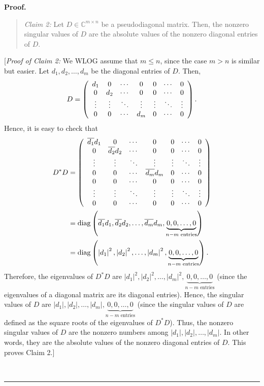 \documentclass[numbers=enddot,12pt,final,onecolumn,notitlepage]{scrartcl}%
\numberwithin{exer}{subsection}
\theoremstyle{definition}
\newenvironment{statement}{\begin{quote}}{\end{quote}}
\newenvironment{proof}[1][Proof]{\noindent\textbf{#1.} }{\ \rule{0.5em}{0.5em}}
\begin{document}
\begin{proof}
\begin{statement}
\textit{Claim 2:} Let $D\in\mathbb{C}^{m\times n}$ be a pseudodiagonal matrix.
Then, the nonzero singular values of $D$ are the absolute values of the
nonzero diagonal entries of $D$.
\end{statement}

[\textit{Proof of Claim 2:} We WLOG assume that $m\leq n$, since the case
$m>n$ is similar but easier. Let $d_{1},d_{2},\ldots,d_{m}$ be the diagonal
entries of $D$. Then,%
\[
D=\left(
\begin{array}
[c]{ccccccc}%
d_{1} & 0 & \cdots & 0 & 0 & \cdots & 0\\
0 & d_{2} & \cdots & 0 & 0 & \cdots & 0\\
\vdots & \vdots & \ddots & \vdots & \vdots & \ddots & \vdots\\
0 & 0 & \cdots & d_{m} & 0 & \cdots & 0
\end{array}
\right)  .
\]
Hence, it is easy to check that%
\begin{align*}
D^{\ast}D  &  =\left(
\begin{array}
[c]{ccccccc}%
\overline{d_{1}}d_{1} & 0 & \cdots & 0 & 0 & \cdots & 0\\
0 & \overline{d_{2}}d_{2} & \cdots & 0 & 0 & \cdots & 0\\
\vdots & \vdots & \ddots & \vdots & \vdots & \ddots & \vdots\\
0 & 0 & \cdots & \overline{d_{m}}d_{m} & 0 & \cdots & 0\\
0 & 0 & \cdots & 0 & 0 & \cdots & 0\\
\vdots & \vdots & \ddots & \vdots & \vdots & \ddots & \vdots\\
0 & 0 & \cdots & 0 & 0 & \cdots & 0
\end{array}
\right) \\
&  =\operatorname*{diag}\left(  \overline{d_{1}}d_{1},\overline{d_{2}}%
d_{2},\ldots,\overline{d_{m}}d_{m},\underbrace{0,0,\ldots,0}_{n-m\text{
entries}}\right) \\
&  =\operatorname*{diag}\left(  \left\vert d_{1}\right\vert ^{2},\left\vert
d_{2}\right\vert ^{2},\ldots,\left\vert d_{m}\right\vert ^{2}%
,\underbrace{0,0,\ldots,0}_{n-m\text{ entries}}\right)  .
\end{align*}
Therefore, the eigenvalues of $D^{\ast}D$ are $\left\vert d_{1}\right\vert
^{2},\left\vert d_{2}\right\vert ^{2},\ldots,\left\vert d_{m}\right\vert
^{2},\underbrace{0,0,\ldots,0}_{n-m\text{ entries}}$ (since the eigenvalues of
a diagonal matrix are its diagonal entries). Hence, the singular values of $D$
are $\left\vert d_{1}\right\vert ,\left\vert d_{2}\right\vert ,\ldots
,\left\vert d_{m}\right\vert ,\underbrace{0,0,\ldots,0}_{n-m\text{ entries}}$
(since the singular values of $D$ are defined as the square roots of the
eigenvalues of $D^{\ast}D$). Thus, the nonzero singular values of $D$ are the
nonzero numbers among $\left\vert d_{1}\right\vert ,\left\vert d_{2}%
\right\vert ,\ldots,\left\vert d_{m}\right\vert $. In other words, they are
the absolute values of the nonzero diagonal entries of $D$. This proves Claim
2.] \medskip


\end{proof}
\end{document}

